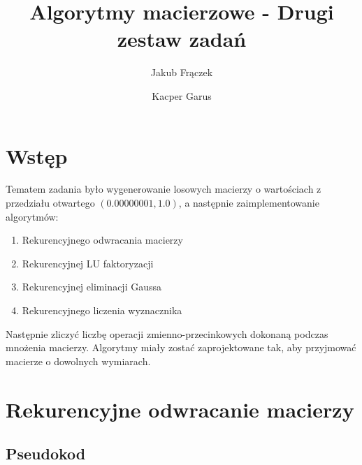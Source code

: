 \documentclass{article}
\title{Algorytmy macierzowe - Drugi zestaw zadań}
\author{Jakub Frączek \and Kacper Garus}
\begin{document}
\sloppy

\maketitle

\tableofcontents

\newpage

\section{Wstęp}

Tematem zadania było wygenerowanie losowych macierzy o wartościach z przedziału otwartego \((0.00000001, 1.0)\), a następnie zaimplementowanie algorytmów:

\begin{enumerate}
    \item Rekurencyjnego odwracania macierzy
    \item Rekurencyjnej LU faktoryzacji
    \item Rekurencyjnej eliminacji Gaussa
    \item Rekurencyjnego liczenia wyznacznika
\end{enumerate}


Następnie zliczyć liczbę operacji zmienno-przecinkowych dokonaną podczas mnożenia macierzy. Algorytmy miały zostać zaprojektowane tak, aby przyjmować macierze o dowolnych wymiarach.

\section{Rekurencyjne odwracanie macierzy}

\subsection{Pseudokod}
\end{document}
